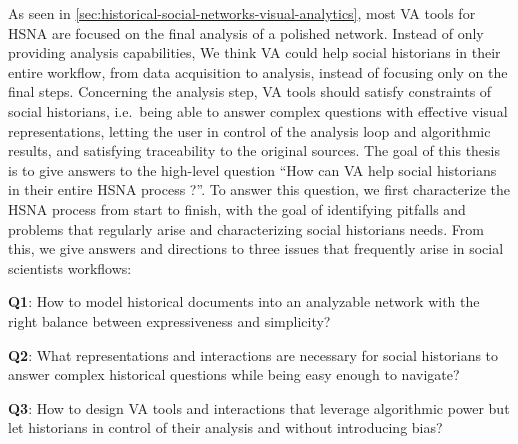 As seen in \autoref{sec:historical-social-networks-visual-analytics}, most VA tools for HSNA are focused on the final analysis of a polished network.
Instead of only providing analysis capabilities, We think VA could help social historians in their entire workflow, from data acquisition to analysis, instead of focusing only on the final steps.
Concerning the analysis step, VA tools should satisfy constraints of social historians, i.e.\ being able to answer complex questions with effective visual representations, letting the user in control of the analysis loop and algorithmic results, and satisfying traceability to the original sources.
The goal of this thesis is to give answers to the high-level question ``How can VA help social historians in their entire HSNA process ?''.
To answer this question, we first characterize the HSNA process from start to finish, with the goal of identifying pitfalls and problems that regularly arise and characterizing social historians needs.
From this, we give answers and directions to three issues that frequently arise in social scientists workflows:

\newcommand{\qone}{\textbf{Q1}: How to model historical documents into an analyzable network with the right balance between expressiveness and simplicity?}
\newcommand{\qtwo}{\textbf{Q2}: What representations and interactions are necessary for social historians to answer complex historical questions while being easy enough to navigate?}
\newcommand{\qthree}{\textbf{Q3}: How to design VA tools and interactions that leverage algorithmic power but let historians in control of their analysis and without introducing bias?}
\begin{description}
    \item \qone
    \item \qtwo
    \item \qthree
\end{description}


